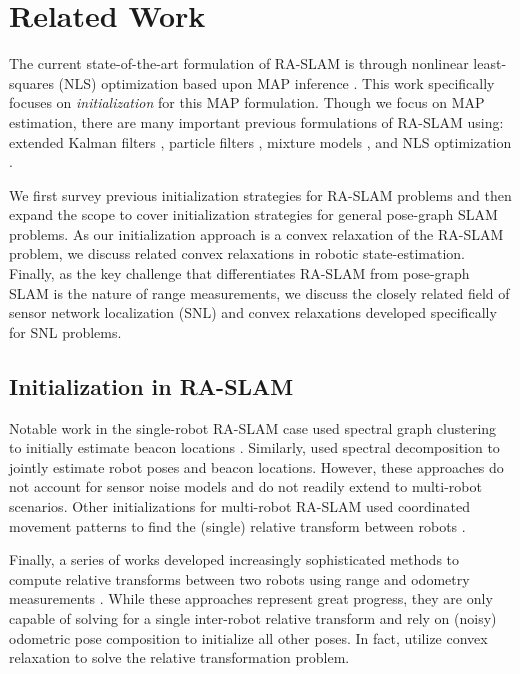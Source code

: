\section{Related Work}

The current state-of-the-art formulation of RA-SLAM is through nonlinear
least-squares (NLS) optimization based upon MAP inference
\cite{dellaert2017factor}. This work specifically focuses on
\textit{initialization} for this MAP formulation. Though we focus on MAP
estimation, there are many important previous formulations of RA-SLAM using:
extended Kalman filters \cite{Newman03icra, menegatti09icra,
Djugash09iros,djugash09springer}, particle filters \cite{gonzalez09ras,
blanco08icra}, mixture models \cite{blanco08iros}, and NLS optimization
\cite{boroson20iros, funabiki21ral, herranz14icra}.

We first survey previous initialization strategies for RA-SLAM problems and then
expand the scope to cover initialization strategies for general pose-graph SLAM
problems. As our initialization approach is a convex relaxation of the RA-SLAM
problem, we discuss related convex relaxations in robotic state-estimation.
Finally, as the key challenge that differentiates RA-SLAM from pose-graph SLAM
is the nature of range measurements, we discuss the closely related field of
sensor network localization (SNL) and convex relaxations developed specifically
for SNL problems.

\subsection{Initialization in RA-SLAM}

Notable work in the single-robot RA-SLAM case used spectral graph clustering to
initially estimate beacon locations \cite{Olson06joe}. Similarly,
\cite{boots13icml} used spectral decomposition to jointly estimate robot poses
and beacon locations. However, these approaches \cite{Olson06joe,boots13icml} do
not account for sensor noise models and do not readily extend to multi-robot
scenarios. Other initializations for multi-robot RA-SLAM used coordinated
movement patterns to find the (single) relative transform between robots
\cite{guo2017ijmav,li20arxiv}.

Finally, a series of works developed increasingly sophisticated methods to
compute relative transforms between two robots using range and odometry
measurements
\cite{zhou08tro,trawny07iros,trawny10rss,trawny10tro,jiang20itaes,li20iros,Li2022ral}.
While these approaches represent great progress, they are only capable of
solving for a single inter-robot relative transform and rely on (noisy)
odometric pose composition to initialize all other poses. In fact,
\cite{jiang20itaes,li20iros,Li2022ral} utilize convex relaxation to solve the
relative transformation problem.

